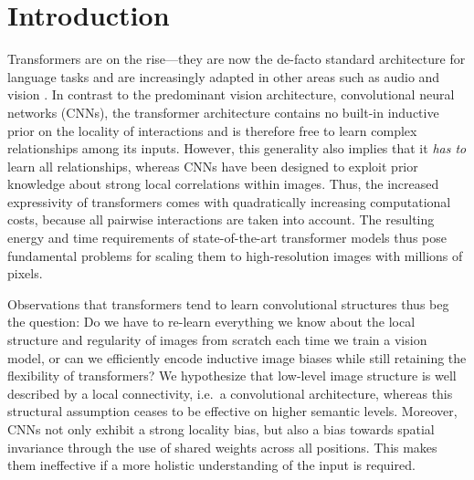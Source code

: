 \documentclass[final]{cvpr}
\begin{document}
\section{Introduction}
%
%
%
\noindent Transformers are on the rise---they are now the de-facto standard architecture
for language tasks
\cite{vaswani2017attention,Radford2018ImprovingLU,Radford2019LanguageMA,brown2020language}
and are increasingly adapted in other areas such as audio
\cite{child2019generating} and vision \cite{chen2020generative,
anonymous2021an}. In contrast to the predominant vision architecture,
convolutional neural networks (CNNs), the transformer architecture contains no
built-in inductive prior on the locality of interactions and is therefore free
to learn complex relationships among its inputs.
\enlargethispage{1\baselineskip}
%
%
However, this generality also implies that it \emph{has to} learn all
relationships, whereas CNNs have been designed to exploit
%
prior knowledge about strong local correlations within images.
Thus, the increased expressivity of transformers comes with quadratically
increasing computational costs, because all pairwise interactions are taken
into account. The resulting energy and time requirements of state-of-the-art
transformer models thus pose fundamental problems for scaling them to
high-resolution images with millions of pixels.
%
%
%
%

%
Observations that transformers tend to learn convolutional structures
\cite{anonymous2021an} thus beg the question: Do we have to re-learn everything
we know about the local structure and regularity of images from scratch each time we train a vision model, or can we efficiently encode inductive image biases while still retaining the flexibility of
transformers? We hypothesize that low-level image structure is well
described by a local connectivity, i.e.\ a convolutional architecture,
whereas this structural assumption ceases to be effective on higher semantic levels.
Moreover, CNNs not only exhibit a strong locality bias, but also a bias towards
spatial invariance through the use of shared weights across all positions. This
makes them ineffective if a more holistic understanding of the input is
required.
\end{document}
